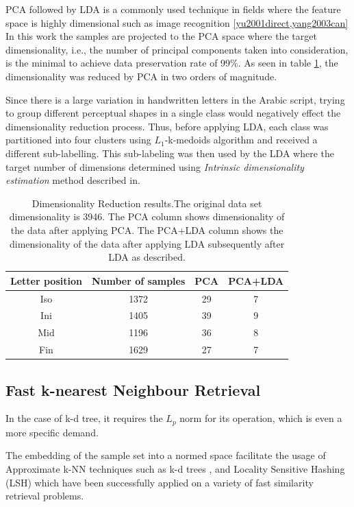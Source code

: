 \documentclass[10pt, conference, compsocconf]{IEEEtran}
\begin{document}
PCA followed by LDA is a commonly used technique in fields where the feature space is highly dimensional such as image recognition \ref{yu2001direct,yang2003can}
In this work the samples are projected to the PCA space where the target dimensionality, i.e., the number of principal components taken into consideration, is the minimal to achieve data preservation rate of 99\%.
As seen in table \ref{table:dr_dimensions_results}, the dimensionality was reduced by PCA in two orders of magnitude.

Since there is a large variation in handwritten letters in the Arabic script, trying to group different perceptual shapes in a single class would negatively effect the dimensionality reduction process.
Thus, before applying LDA, each class was partitioned into four clusters using $L_1$-k-medoids algorithm and received a different sub-labelling. 
This sub-labeling was then used by the LDA where the target number of dimensions determined using \emph{Intrinsic dimensionality estimation} method described in\cite{van2007introduction}.

\begin{table}
\centering
\begin{tabular}{ | c | c | c | c |}
\hline
Letter position & Number of samples & PCA & PCA+LDA\\
\hline                 
  Iso & 1372 & 29 & 7 \\ 
  \hline
  Ini & 1405 & 39 & 9 \\ 
  \hline
  Mid & 1196 & 36 & 8 \\ 
  \hline
  Fin & 1629 & 27 & 7 \\ 
  \hline
\end{tabular}
\caption{Dimensionality Reduction results.The original data set dimensionality is 3946. The PCA column shows dimensionality of the data after applying PCA. The PCA+LDA column shows the dimensionality of the data after applying LDA subsequently after LDA as described.}
\label{table:dr_dimensions_results} 
\end{table}

\subsection{Fast k-nearest Neighbour Retrieval}

In the case of k-d tree, it requires the $L_p$ norm for its operation, which is even a more specific demand.


The embedding of the sample set into a normed space facilitate the usage of Approximate k-NN techniques such as k-d trees \cite{bentley1975multidimensional}, and Locality Sensitive Hashing (LSH) \cite{gionis1999similarity} which have been successfully applied on a variety of fast similarity retrieval problems. 
\end{document}
